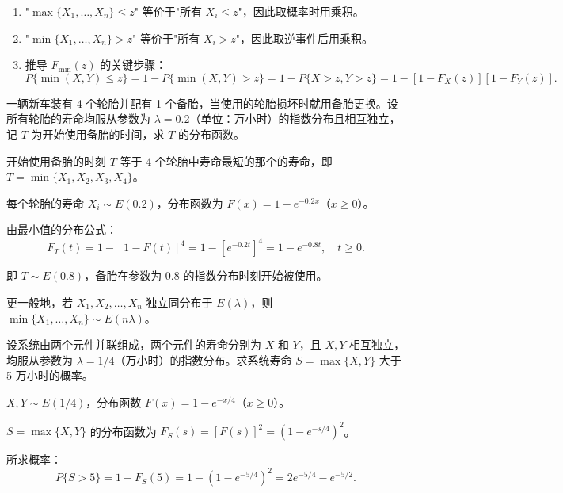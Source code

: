 ﻿\documentclass[lang=cn,11pt]{elegantbook}
\begin{document}
\begin{remark}
\begin{enumerate}
    \item "$\max\{X_1, \dots, X_n\} \leqslant z$" 等价于"所有 $X_i \leqslant z$"，因此取概率时用乘积。
    \item "$\min\{X_1, \dots, X_n\} > z$" 等价于"所有 $X_i > z$"，因此取逆事件后用乘积。
    \item 推导 $F_{\min}(z)$ 的关键步骤：
    \[
    P\{\min(X,Y) \leqslant z\} = 1 - P\{\min(X,Y) > z\} = 1 - P\{X > z, Y > z\} = 1 - [1-F_X(z)][1-F_Y(z)].
    \]
\end{enumerate}
\end{remark}

\begin{exercise}\label{exer:3-9}
一辆新车装有 4 个轮胎并配有 1 个备胎，当使用的轮胎损坏时就用备胎更换。设所有轮胎的寿命均服从参数为 $\lambda = 0.2$（单位：万小时）的指数分布且相互独立，记 $T$ 为开始使用备胎的时间，求 $T$ 的分布函数。
\end{exercise}

\begin{solution}
开始使用备胎的时刻 $T$ 等于 4 个轮胎中寿命最短的那个的寿命，即 $T = \min\{X_1, X_2, X_3, X_4\}$。

每个轮胎的寿命 $X_i \sim E(0.2)$，分布函数为 $F(x) = 1 - e^{-0.2x}$（$x \geqslant 0$）。

由最小值的分布公式：
\[
F_T(t) = 1 - [1 - F(t)]^4 = 1 - [e^{-0.2t}]^4 = 1 - e^{-0.8t}, \quad t \geqslant 0.
\]

即 $T \sim E(0.8)$，备胎在参数为 $0.8$ 的指数分布时刻开始被使用。

\begin{note}
更一般地，若 $X_1, X_2, \dots, X_n$ 独立同分布于 $E(\lambda)$，则 $\min\{X_1, \dots, X_n\} \sim E(n\lambda)$。
\end{note}
\end{solution}

\begin{exercise}[并联系统最大值分布] \label{exer:3-10}
设系统由两个元件并联组成，两个元件的寿命分别为 $X$ 和 $Y$，且 $X, Y$ 相互独立，均服从参数为 $\lambda = 1/4$（万小时）的指数分布。求系统寿命 $S = \max\{X, Y\}$ 大于 5 万小时的概率。
\end{exercise}

\begin{solution}
$X, Y \sim E(1/4)$，分布函数 $F(x) = 1 - e^{-x/4}$（$x \geqslant 0$）。

$S = \max\{X, Y\}$ 的分布函数为 $F_S(s) = [F(s)]^2 = (1-e^{-s/4})^2$。

所求概率：
\[
P\{S > 5\} = 1 - F_S(5) = 1 - (1 - e^{-5/4})^2 = 2e^{-5/4} - e^{-5/2}.
\]
\end{solution}
\end{document}
